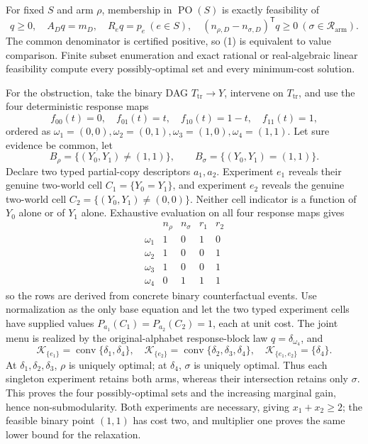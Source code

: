For fixed \(S\) and arm \(\rho\), membership in \(\operatorname{PO}(S)\) is exactly feasibility of
\[
q\ge0,\quad A_Dq=m_D,\quad R_eq=p_e\ (e\in S),\quad
(n_{\rho,D}-n_{\sigma,D})^{\mathsf T}q\ge0\ (\sigma\in\mathcal R_{\mathrm{arm}}).
\tag{1}
\]
The common denominator is certified positive, so (1) is equivalent to value comparison.  Finite subset enumeration and exact rational or real-algebraic linear feasibility compute every possibly-optimal set and every minimum-cost solution.

For the obstruction, take the binary DAG \(T_{\mathrm{tr}}\to Y\), intervene on \(T_{\mathrm{tr}}\), and use the four deterministic response maps
\[
f_{00}(t)=0,\quad f_{01}(t)=t,\quad f_{10}(t)=1-t,\quad f_{11}(t)=1,
\]
ordered as \(\omega_1=(0,0),\omega_2=(0,1),\omega_3=(1,0),\omega_4=(1,1)\).  Let sure evidence be common, let
\[
B_\rho=\{(Y_0,Y_1)\ne(1,1)\},\qquad
B_\sigma=\{(Y_0,Y_1)=(1,1)\}.
\]
Declare two typed partial-copy descriptors \(a_1,a_2\).  Experiment \(e_1\) reveals their genuine two-world cell \(C_1=\{Y_0=Y_1\}\), and experiment \(e_2\) reveals the genuine two-world cell \(C_2=\{(Y_0,Y_1)\ne(0,0)\}\).  Neither cell indicator is a function of \(Y_0\) alone or of \(Y_1\) alone.  Exhaustive evaluation on all four response maps gives
\[
\begin{array}{c|rrrr}
&n_\rho&n_\sigma&r_1&r_2\\\hline
\omega_1&1&0&1&0\\
\omega_2&1&0&0&1\\
\omega_3&1&0&0&1\\
\omega_4&0&1&1&1
\end{array}
\tag{2}
\]
so the rows are derived from concrete binary counterfactual events.  Use normalization as the only base equation and let the two typed experiment cells have supplied values \(P_{a_1}(C_1)=P_{a_2}(C_2)=1\), each at unit cost.  The joint menu is realized by the original-alphabet response-block law \(q=\delta_{\omega_4}\), and
\[
\mathcal K_{\{e_1\}}=\operatorname{conv}\{\delta_1,\delta_4\},\quad
\mathcal K_{\{e_2\}}=\operatorname{conv}\{\delta_2,\delta_3,\delta_4\},\quad
\mathcal K_{\{e_1,e_2\}}=\{\delta_4\}.
\]
At \(\delta_1,\delta_2,\delta_3\), \(\rho\) is uniquely optimal; at \(\delta_4\), \(\sigma\) is uniquely optimal.  Thus each singleton experiment retains both arms, whereas their intersection retains only \(\sigma\).  This proves the four possibly-optimal sets and the increasing marginal gain, hence non-submodularity.  Both experiments are necessary, giving \(x_1+x_2\ge2\); the feasible binary point \((1,1)\) has cost two, and multiplier one proves the same lower bound for the relaxation.